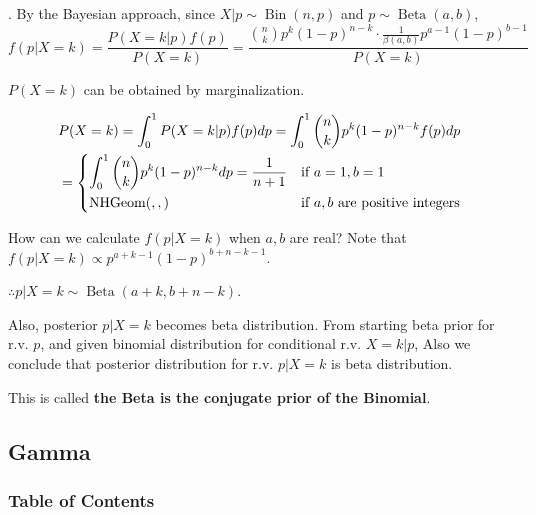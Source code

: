 \documentclass[8pt]{beamer}
\newcommand{\tb}[1]{\textbf{#1}}
\newcommand{\Bin}[2]{\operatorname{Bin}\!\left(#1,#2\right)}
\newcommand{\Beta}[2]{\operatorname{Beta}\!\left(#1, #2\right)}
\newcommand{\NHGeom}[3]{\operatorname{NHGeom}\!\left(#1,#2, #3\right)}
\begin{document}
\begin{frame}{.}
    By the Bayesian approach, since $X|p \sim \Bin{n}{p}$ and $p \sim \Beta{a}{b}$,
    \[
        f(p|X=k) = \frac{P(X=k|p)f(p)}{P(X=k)} = \frac{\binom{n}{k}p^{k} (1-p)^{n-k} \cdot \frac{1}{\beta(a,b)}p^{a-1} (1-p)^{b-1}}{P(X=k)}
    \]

    $P(X=k)$ can be obtained by marginalization.

    \[
        \begin{aligned}
        &P(X=k) = \int_{0}^1 P(X=k|p)f(p) dp= \int_0^1 \binom{n}{k} p^k (1-p)^{n-k} f(p) dp \\
        &= 
        \begin{dcases}
            \int_0^1 \binom{n}{k} p^k (1-p)^{n-k} dp = \frac{1}{n+1} & \text{if } a=1, b=1\\
           \NHGeom{}{}{} & \text{if } a,b \text{ are positive integers} 
        \end{dcases}
        \end{aligned}
    \]

    How can we calculate $f(p|X=k)$ when $a,b$ are real?
    Note that $f(p|X=k) \propto p^{a+k-1} (1-p)^{b+n-k-1}$.

    $\therefore p|X=k \sim \Beta{a+k}{b+n-k}$.

    Also, posterior $p|X=k$ becomes beta distribution.  From starting beta prior for r.v. $p$, and given binomial distribution for conditional r.v. $X=k|p$, Also we conclude that posterior distribution for r.v. $p|X=k$ is beta distribution. 

    This is called \tb{the Beta is the conjugate prior of the Binomial}.

\end{frame}

\subsection{Gamma}
\begingroup
    \begin{frame}
        \frametitle{Table of Contents}
        \tableofcontents[currentsubsection]
    \end{frame}
\endgroup
\end{document}
